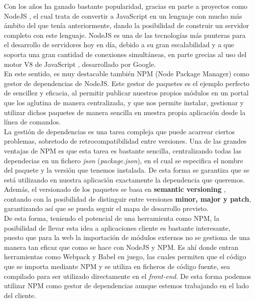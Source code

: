 Con los años ha ganado bastante popularidad, gracias en parte a proyectos como NodeJS \cite{node}, el cual trata de convertir a JavaScript en un lenguaje con mucho más ámbito del que tenía anteriormente, dando la posibilidad de construir un servidor completo con este lenguaje. NodeJS es una de las tecnologías más punteras para el desarrollo de servidores hoy en día, debido a su gran escalabilidad y a que soporta una gran cantidad de conexiones simultáneas, en parte grecias al uso del motor V8 de JavaScript \cite{motor-v8}, desarrollado por Google. \\

En este sentido, es muy destacable también NPM (Node Package Manager) \cite{npm} como gestor de dependencias de NodeJS. Este gestor de paquetes es el ejemplo perfecto de sencillez y eficacia, al permitir publicar nuestros propios módulos en un portal que los aglutina de manera centralizada, y que nos permite instalar, gestionar y utilizar dichos paquetes de manera sencilla en nuestra propia aplicación desde la línea de comandos. \\

La gestión de dependencias es una tarea compleja que puede acarrear ciertos problemas, sobretodo de retrocompatibilidad entre versiones. Una de las grandes ventajas de NPM es que esta tarea es bastante sencilla, centralizando todas las dependecias en un fichero \textit{json} (\textit{package.json}), en el cual se especifica el nombre del paquete y la versión que tenemos instalada. De esta forma se garantiza que se está utilizando en nuestra aplicación exactamente la dependencia que queremos. \\

Además, el versionado de los paquetes se basa en \textbf{semantic versioning} \cite{semver}, contando con la posibilidad de distinguir entre versiones \textbf{minor, major y patch}, garantizando así que se pueda seguir el mapa de desarrollo previsto. \\

De esta forma, teniendo el potencial de una herramienta como NPM, la posibilidad de llevar esta idea a aplicaciones cliente es bastante interesante, puesto que para la web la importación de módulos externos no se gestiona de una manera tan eficaz que como se hace con NodeJS y NPM. Es ahí donde entran herramientas como Webpack \cite{webpack} y Babel \cite{babel} en juego, las cuales permiten que el código que se importa mediante NPM y se utiliza en ficheros de código fuente, sea compilado para ser utilizado directamente en el \textit{front-end}. De esta forma podemos utilizar NPM como gestor de dependencias aunque estemos trabajando en el lado del cliente. \\

